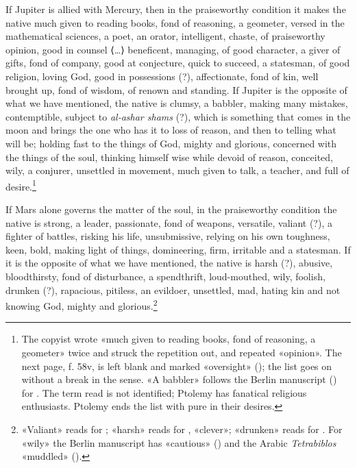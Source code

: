 \documentclass[11pt]{article}
\newcommand{\Fol}[1]{\marginpar{\footnotesize\color{gray}f.\,#1}}
\begin{document}
\par \Fol{58v}\Fol{59r}If Jupiter is allied with Mercury, then in the praiseworthy condition it makes the native much given to reading books, fond of reasoning, a geometer, versed in the mathematical sciences, a poet, an orator, intelligent, chaste, of praiseworthy opinion, good in counsel {\mdseries ⟨}…{\mdseries ⟩} beneficent, managing, of good character, a giver of gifts, fond of company, good at conjecture, quick to succeed, a statesman, of good religion, loving God, good in possessions (?), affectionate, fond of kin, well brought up, fond of wisdom, of renown and standing. If Jupiter is the opposite of what we have mentioned, the native is clumsy, a babbler, making many mistakes, contemptible, subject to \emph{al-ashar shams} (?), which is something that comes in the moon and brings the one who has it to loss of reason, and then to telling what will be; holding fast to the things of God, mighty and glorious, concerned with the things of the soul, thinking himself wise while devoid of reason, conceited, wily, a conjurer, unsettled in movement, much given to talk, a teacher, and full of desire.\footnote{The copyist wrote «much given to reading books, fond of reasoning, a geometer» twice and struck the repetition out, and repeated «opinion». The next page, f. 58v, is left blank and marked «oversight» (); the list goes on without a break in the sense. «A babbler» follows the Berlin manuscript () for . The term read  is not identified; Ptolemy has fanatical religious enthusiasts. Ptolemy ends the list with pure in their desires.}\par
\par If Mars alone governs the matter of the soul, in the praiseworthy condition the native is strong, a leader, passionate, fond of weapons, versatile, valiant (?), a fighter of battles, risking his life, unsubmissive, relying on his own toughness, keen, bold, making light of things, domineering, firm, irritable and a statesman. If it is the opposite of what we have mentioned, the native is harsh (?), abusive, bloodthirsty, fond of disturbance, a spendthrift, loud-mouthed, wily, foolish, drunken (?), rapacious, pitiless, an evildoer, unsettled, mad, hating kin and not knowing God, mighty and glorious.\footnote{«Valiant» reads  for ; «harsh» reads  for , «clever»; «drunken» reads  for . For «wily» the Berlin manuscript has «cautious» () and the Arabic \emph{Tetrabiblos} «muddled» ().}\par
\end{document}
